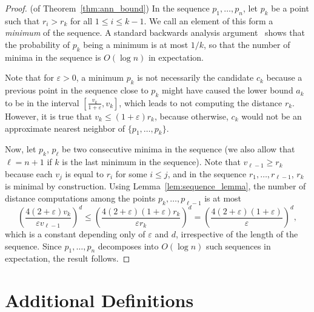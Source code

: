 \documentclass[]{ws-ijcga}
\renewcommand{\leq}{\leqslant}
\renewcommand{\geq}{\geqslant}
\newcommand{\eps}{\varepsilon}
\begin{document}
\begin{proof} (of Theorem~\ref{thm:ann_bound})
%
In the sequence $p_1,\ldots,p_n$, let $p_k$ be a point 
such that $r_i > r_k$ for all $1\leq i\leq k-1$. We call an element
of this form a \emph{minimum} of the sequence. 
A standard backwards analysis argument~\cite{seidel-backwards} shows that the probability
of $p_k$ being a minimum is at most $1/k$, so that the number of minima
in the sequence is $O(\log n)$ in expectation.

Note that for $\eps>0$,
a minimum $p_k$ is not necessarily the candidate $c_k$ because a previous point
in the sequence close to $p_k$ might have caused the lower bound $a_k$ to be
in the interval $[\frac{v_k}{1+\eps},v_k]$, which leads to not
computing the distance $r_k$. However, it is true that
$v_k\leq (1+\eps)r_k$, because otherwise, $c_k$ would not be an approximate
nearest neighbor of $\{p_1,\ldots,p_k\}$.

Now, let $p_k$, $p_\ell$ be two consecutive minima in the sequence
(we also allow that $\ell=n+1$ if $k$ is the last minimum in the sequence).
Note that $v_{\ell-1}\geq r_k$ because each $v_j$ is equal to $r_i$ for
some $i\leq j$, and in the sequence $r_1,\ldots,r_{\ell-1}$, $r_k$
is minimal by construction. Using Lemma~\ref{lem:sequence_lemma},
the number of distance computations among the points
$p_k,\ldots,p_{\ell-1}$ is at most
\[
\left(\frac{4(2+\eps) v_k}{\eps v_{\ell-1}}\right)^{d}\leq \left(\frac{4(2+\eps)(1+\eps)r_k}{\eps r_k}\right)^{d}=\left(\frac{4(2+\eps)(1+\eps)}{\eps}\right)^{d},\]
which is a constant depending only of $\eps$ and $d$, irrespective of the length of the sequence.
Since $p_1,\ldots,p_n$ decomposes into $O(\log n)$ such sequences in expectation, the result follows.
\end{proof}




\section{Additional Definitions}
\label{sec:appendix_background}
\end{document}
